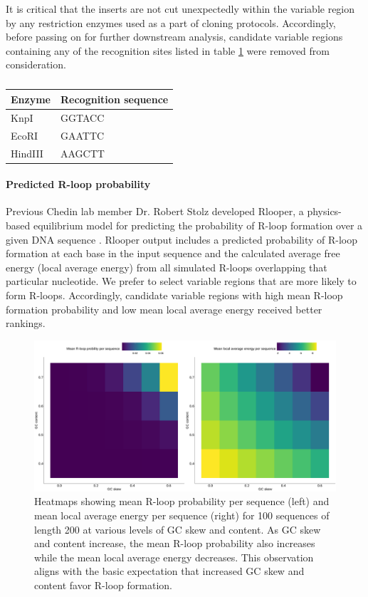 \documentclass[11pt]{article}
\begin{document}
It is critical that the inserts are not cut unexpectedly within the variable region by any restriction enzymes used as a part of cloning protocols. Accordingly, before passing on for further downstream analysis, candidate variable regions containing any of the recognition sites listed in table \ref{tab:enzymes} were removed from consideration.

\begin{table}[H]
	\caption{}
	\label{tab:enzymes}
	\centering
	\begin{tabular}{@{}ll@{}}
		\toprule
		Enzyme  & Recognition sequence \\ \midrule
		KnpI    & GGTACC               \\
		EcoRI   & GAATTC               \\
		HindIII & AAGCTT               \\ \bottomrule
	\end{tabular}
\end{table}


\paragraph{Predicted R-loop probability}

Previous Chedin lab member Dr. Robert Stolz developed Rlooper, a physics-based equilibrium model for predicting the probability of R-loop formation over a given DNA sequence \cite{Stolz2019}. Rlooper output includes a predicted probability of R-loop formation at each base in the input sequence and the calculated average free energy (local average energy) from all simulated R-loops overlapping that particular nucleotide. We prefer to select variable regions that are more likely to form R-loops. Accordingly, candidate variable regions with high mean R-loop formation probability and low mean local average energy received better rankings.

\begin{figure}[H]
	\includegraphics[width=14cm]{images/plots/rlooper_expect_tile.png}
	\centering
	\caption{Heatmaps showing mean R-loop probability per sequence (left) and mean local average energy per sequence (right) for 100 sequences of length 200 at various levels of GC skew and content. As GC skew and content increase, the mean R-loop probability also increases while the mean local average energy decreases. This observation aligns with the basic expectation that increased GC skew and content favor R-loop formation.}
	\label{fig:rlooper-expect}
\end{figure}
\end{document}

